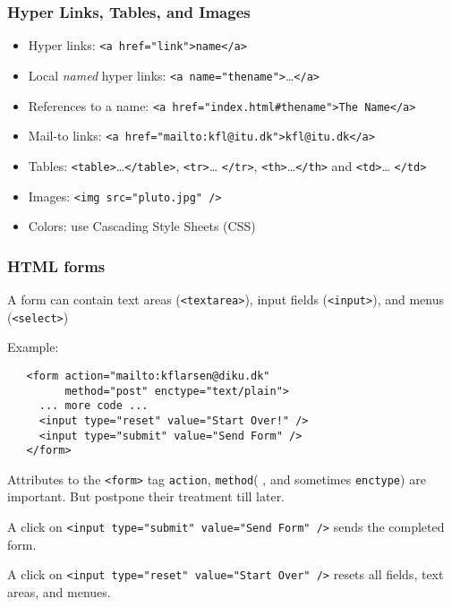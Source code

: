 \documentclass[dvipsnames]{beamer}
\begin{document}
\begin{frame}
\frametitle{Hyper Links, Tables, and Images}
\begin{itemize}
\item Hyper links: \texttt{<a href="link">name</a>}
\item Local \emph{named} hyper links: \texttt{<a
    name="thename">}\ldots\texttt{</a>}
\item References to a name: \texttt{<a href="index.html\#thename">The Name</a>}
\item Mail-to links: \texttt{<a href="mailto:kfl@itu.dk">kfl@itu.dk</a>}
\item Tables: \texttt{<table>}\ldots \texttt{</table>}, \texttt{<tr>}\ldots
  \texttt{</tr>}, \texttt{<th>}\ldots \texttt{</th>} and \texttt{<td>}\ldots
  \texttt{</td>}
\item Images: \texttt{<img src="pluto.jpg" />}
\item Colors: use Cascading Style Sheets (CSS)
\end{itemize}
\end{frame}

\begin{frame}[fragile]
\frametitle{HTML forms}
  
A form can contain text areas (\verb+<textarea>+),
input fields (\verb+<input>+), and menus (\verb+<select>+)

Example: 

\begin{verbatim}
   <form action="mailto:kflarsen@diku.dk" 
         method="post" enctype="text/plain">
     ... more code ...
     <input type="reset" value="Start Over!" />
     <input type="submit" value="Send Form" />
   </form>
\end{verbatim}

Attributes to the \verb+<form>+ tag \texttt{action}, \texttt{method}( ,
and sometimes \texttt{enctype}) are important.  But postpone their
treatment till later.

  
  

A click on \verb+<input type="submit" value="Send Form" />+ sends the
completed form.

A click on \verb+<input type="reset" value="Start Over" />+ resets all
fields, text areas, and menues.
\end{frame}
\end{document}
